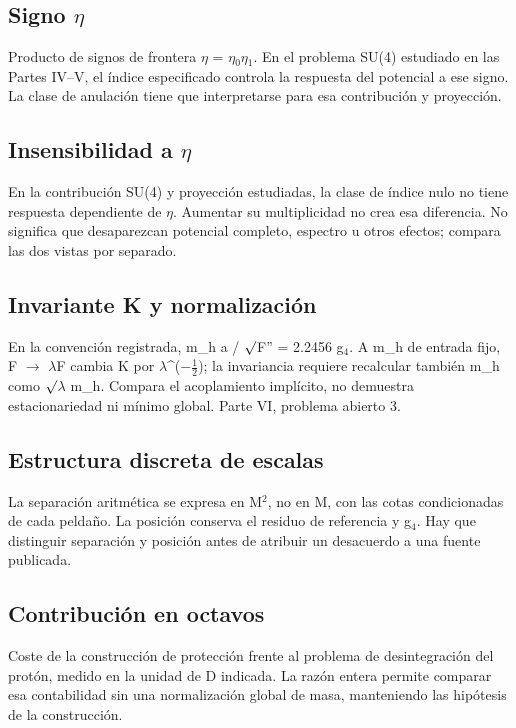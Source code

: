 \documentclass[11pt,a4paper]{article}
\begin{document}
\subsection*{Signo \ensuremath{\eta}}
Producto de signos de frontera \ensuremath{\eta} = \ensuremath{\eta}\ensuremath{{}_{0}}\ensuremath{\eta}\ensuremath{{}_{1}}. En el problema SU(4) estudiado en las Partes IV--V, el índice especificado controla la respuesta del potencial a ese signo. La clase de anulación tiene que interpretarse para esa contribución y proyección.

\subsection*{Insensibilidad a \ensuremath{\eta}}
En la contribución SU(4) y proyección estudiadas, la clase de índice nulo no tiene respuesta dependiente de \ensuremath{\eta}. Aumentar su multiplicidad no crea esa diferencia. No significa que desaparezcan potencial completo, espectro u otros efectos; compara las dos vistas por separado.

\subsection*{Invariante K y normalización}
En la convención registrada, m\_h a / \ensuremath{\surd}F'' = 2.2456 g\ensuremath{{}_{4}}. A m\_h de entrada fijo, F \ensuremath{\rightarrow} \ensuremath{\lambda}F cambia K por \ensuremath{\lambda}\textasciicircum{}(\ensuremath{-}\ensuremath{\frac{1}{2}}); la invariancia requiere recalcular también m\_h como \ensuremath{\surd}\ensuremath{\lambda} m\_h. Compara el acoplamiento implícito, no demuestra estacionariedad ni mínimo global. Parte VI, problema abierto 3.

\subsection*{Estructura discreta de escalas}
La separación aritmética se expresa en M\ensuremath{{}^{2}}, no en M, con las cotas condicionadas de cada peldaño. La posición conserva el residuo de referencia y g\ensuremath{{}_{4}}. Hay que distinguir separación y posición antes de atribuir un desacuerdo a una fuente publicada.

\subsection*{Contribución en octavos}
Coste de la construcción de protección frente al problema de desintegración del protón, medido en la unidad de D indicada. La razón entera permite comparar esa contabilidad sin una normalización global de masa, manteniendo las hipótesis de la construcción.
\end{document}
